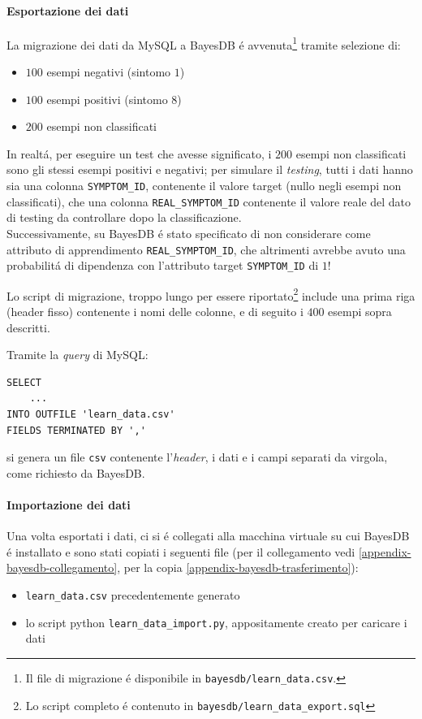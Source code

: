 \documentclass[preprint]{acm_proc_article-sp}
\begin{document}
\paragraph{Esportazione dei dati}
La migrazione dei dati da MySQL a BayesDB \'e avvenuta\footnote{Il file di migrazione \'e disponibile in \verb|bayesdb/learn_data.csv|.} tramite selezione di:
\begin{itemize}
\item $100$ esempi negativi (sintomo $1$)
\item $100$ esempi positivi (sintomo $8$)
\item $200$ esempi non classificati
\end{itemize}
In realt\'a, per eseguire un test che avesse significato, i $200$ esempi non classificati sono gli stessi esempi positivi e negativi; per simulare il \textit{testing}, tutti i dati hanno sia una colonna \verb|SYMPTOM_ID|, contenente il valore target (nullo negli esempi non classificati), che una colonna \verb|REAL_SYMPTOM_ID| contenente il valore reale del dato di testing da controllare dopo la classificazione.
\\
Successivamente, su BayesDB \'e stato specificato di non considerare come attributo di apprendimento \verb|REAL_SYMPTOM_ID|, che altrimenti avrebbe avuto una probabilit\'a di dipendenza con l'attributo target \verb|SYMPTOM_ID| di $1$!

Lo script di migrazione, troppo lungo per essere riportato\footnote{Lo script completo \'e contenuto in \verb|bayesdb/learn_data_export.sql|} include una prima riga (header fisso) contenente i nomi delle colonne, e di seguito i $400$ esempi sopra descritti.

Tramite la \textit{query} di MySQL:
\begin{verbatim}
SELECT
	...
INTO OUTFILE 'learn_data.csv'
FIELDS TERMINATED BY ','
\end{verbatim}
si genera un file \verb|csv| contenente l'\textit{header}, i dati e i campi separati da virgola, come richiesto da BayesDB.

\paragraph{Importazione dei dati}
Una volta esportati i dati, ci si \'e collegati alla macchina virtuale su cui BayesDB \'e installato e sono stati copiati i seguenti file (per il collegamento vedi \ref{appendix-bayesdb-collegamento}, per la copia \ref{appendix-bayesdb-trasferimento}):
\begin{itemize}
\item \verb|learn_data.csv| precedentemente generato
\item lo script python \verb|learn_data_import.py|, appositamente creato per caricare i dati
\end{itemize}
\end{document}
